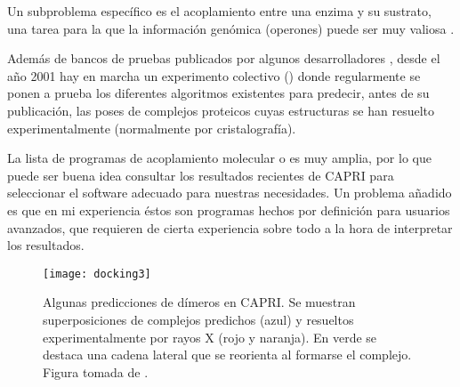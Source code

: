 Un subproblema espec\'{i}fico es el acoplamiento entre una enzima y su sustrato, una tarea para la que la informaci\'{o}n
gen\'{o}mica (operones) puede ser muy valiosa \citep{Zhao2013}.

Adem\'{a}s de bancos de pruebas publicados por algunos desarrolladores \citep{Yu2016}, 
desde el a\~no 2001 hay en marcha un experimento colectivo () 
donde regularmente se ponen a prueba los diferentes algoritmos existentes
para predecir, antes de su publicaci\'{o}n, las poses de complejos proteicos cuyas estructuras se han resuelto experimentalmente 
(normalmente por cristalograf\'{i}a).  

La lista de programas de acoplamiento molecular o  es muy amplia, por lo que puede ser buena idea consultar los resultados recientes de CAPRI para seleccionar el software adecuado 
para nuestras necesidades. Un problema a\~nadido es que en mi experiencia \'{e}stos son programas 
hechos por definici\'{o}n para usuarios avanzados, que requieren de cierta experiencia sobre todo a la hora de interpretar los resultados.

\begin{figure}
\begin{center} 
\texttt{[image: docking3]}
\caption%
{
Algunas predicciones de d\'{i}meros en CAPRI. 
Se muestran superposiciones de complejos predichos (azul) y resueltos experimentalmente por rayos X (rojo y naranja). 
En verde se destaca una cadena lateral que se reorienta al formarse el complejo. 
Figura tomada de . 
}
\label{fig:docking}
\end{center}
\end{figure} 


